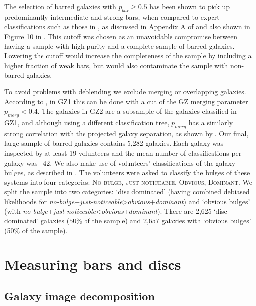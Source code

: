 \documentclass[a4paper,fleqn,usenatbib,useAMS]{mnras}
\begin{document}
The selection of barred galaxies with $p_{bar}\geq0.5$ has been shown to pick up predominantly intermediate and strong bars, when compared to expert classifications such as those in \citet{Nair2010}, as discussed in Appendix A of \citet{Masters2012} and also shown in Figure 10 in \citet{Willett2013}. This cutoff was chosen as an unavoidable compromise between having a sample with high purity and a complete sample of barred galaxies. Lowering the cutoff would increase the completeness of the sample by including a higher fraction of weak bars, but would also contaminate the sample with non-barred galaxies.

To avoid problems with deblending we exclude merging or overlapping galaxies. According to \citet{Darg2010}, in GZ1 \citep{Lintott2011} this can be done with a cut of the GZ merging parameter $p_{merg} < 0.4$. The galaxies in GZ2 are a subsample of the galaxies classified in GZ1, and although using a different classification tree, $p_{merg}$ has a similarly strong correlation with the projected galaxy separation, as shown by \citet{Casteels2013}. Our final, large sample of barred galaxies contains 5,282 galaxies. Each galaxy was inspected by at least 19 volunteers and the mean number of classifications per galaxy was ~42. We also make use of volunteers' classifications of the galaxy bulges, as described in \citet{Simmons2013}. The volunteers were asked to classify the bulges of these systems into four categories: \textsc{No-bulge}, \textsc{Just-noticeable}, \textsc{Obvious}, \textsc{Dominant}. We split the sample into two categories: `disc dominated' (having combined debiased likelihoods for \textit{no-bulge}+\textit{just-noticeable}>\textit{obvious}+\textit{dominant}) and `obvious bulges' (with \textit{no-bulge}+\textit{just-noticeable}<\textit{obvious}+\textit{dominant}). There are 2,625 `disc dominated' galaxies (50\% of the sample) and 2,657 galaxies with `obvious bulges' (50\% of the sample).

\section{Measuring bars and discs}

\subsection{Galaxy image decomposition}
\end{document}
